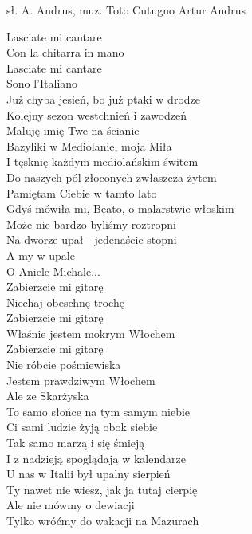 {sł. A. Andrus, muz. Toto Cutugno}
{Artur Andrus}
\begin{text}
Lasciate mi cantare\\
Con la chitarra in mano\\
Lasciate mi cantare\\
Sono l'Italiano \\

Już chyba jesień, bo już ptaki w drodze\\
Kolejny sezon westchnień i zawodzeń\\
Maluję imię Twe na ścianie\\
Bazyliki w Mediolanie, moja Miła\\

I tęsknię każdym mediolańskim świtem\\
Do naszych pól złoconych zwłaszcza żytem\\
Pamiętam Ciebie w tamto lato\\
Gdyś mówiła mi, Beato, o malarstwie włoskim\\

Może nie bardzo byliśmy roztropni\\
Na dworze upał - jedenaście stopni\\
A my w upale \\
O Aniele Michale...\\

Zabierzcie mi gitarę\\
Niechaj obeschnę trochę\\
Zabierzcie mi gitarę\\
Właśnie jestem mokrym Włochem\\

Zabierzcie mi gitarę\\
Nie róbcie pośmiewiska\\
Jestem prawdziwym Włochem\\
Ale ze Skarżyska\\

To samo słońce na tym samym niebie\\
Ci sami ludzie żyją obok siebie\\
Tak samo marzą i się śmieją\\
I z nadzieją spoglądają w kalendarze\\

U nas w Italii był upalny sierpień\\
Ty nawet nie wiesz, jak ja tutaj cierpię\\
Ale nie mówmy o dewiacji\\
Tylko wróćmy do wakacji na Mazurach\\


\end{text}
